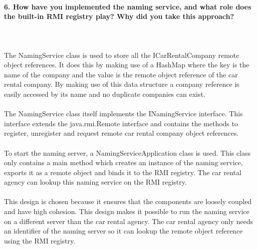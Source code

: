 \documentclass{ds-report}
\begin{document}
	\paragraph{6. How have you implemented the naming service, and what role does the built-in RMI registry play? Why did you take this approach?} \mbox{}\\\\
The NamingService class is used to store all the ICarRentalCompany remote object references. It does this by making use of a HashMap where the key is the name of the company and the value is the remote object reference of the car rental company. By making use of this data structure a company reference is easily accessed by its name and no duplicate companies can exist.\\\\
The NamingService class itself implements the INamingService interface. This interface extends the java.rmi.Remote interface and contains the methods to register, unregister and request remote car rental company object references.\\\\
To start the naming server, a NamingServiceApplication class is used. This class only contains a main method which creates an instance of the naming service, exports it as a remote object and binds it to the RMI registry. The car rental agency can lookup this naming service on the RMI registry.\\\\
This design is chosen because it ensures that the components are loosely coupled and have high cohesion. This design makes it possible to run the naming service on a different server than the car rental agency. The car rental agency only needs an identifier of the naming server so it can lookup the remote object reference using the RMI registry.
 
\end{document}
